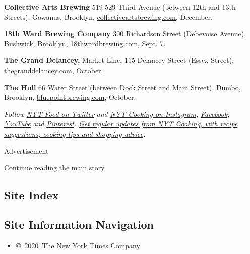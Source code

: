 \textbf{Collective Arts Brewing} 519-529 Third Avenue (between 12th and
13th Streets), Gowanus, Brooklyn,
\href{https://collectiveartsbrewing.com/}{collectiveartsbrewing.com},
December.

\textbf{18th Ward Brewing Company} 300 Richardson Street (Debevoise
Avenue), Bushwick, Brooklyn,
\href{https://www.18thwardbrewing.com/}{18thwardbrewing.com}, Sept. 7.

\textbf{The Grand Delancey,} Market Line, 115 Delancey Street (Essex
Street), \href{https://thegranddelancey.com/}{thegranddelancey.com},
October.

\textbf{The Hull} 66 Water Street (between Dock Street and Main Street),
Dumbo, Brooklyn,
\href{https://www.bluepointbrewing.com}{bluepointbrewing.com}, October.

\emph{Follow} \href{https://twitter.com/nytfood}{\emph{NYT Food on
Twitter}} \emph{and}
\href{https://www.instagram.com/nytcooking/}{\emph{NYT Cooking on
Instagram}}\emph{,}
\href{https://www.facebookcorewwwi.onion/nytcooking/}{\emph{Facebook}}\emph{,}
\href{https://www.youtube.com/nytcooking}{\emph{YouTube}} \emph{and}
\href{https://www.pinterest.com/nytcooking/}{\emph{Pinterest}}\emph{.}
\href{https://www.nytimes3xbfgragh.onion/newsletters/cooking}{\emph{Get
regular updates from NYT Cooking, with recipe suggestions, cooking tips
and shopping advice}}\emph{.}

Advertisement

\protect\hyperlink{after-bottom}{Continue reading the main story}

\hypertarget{site-index}{%
\subsection{Site Index}\label{site-index}}

\hypertarget{site-information-navigation}{%
\subsection{Site Information
Navigation}\label{site-information-navigation}}

\begin{itemize}
\tightlist
\item
  \href{https://help.nytimes3xbfgragh.onion/hc/en-us/articles/115014792127-Copyright-notice}{©~2020~The
  New York Times Company}
\end{itemize}

